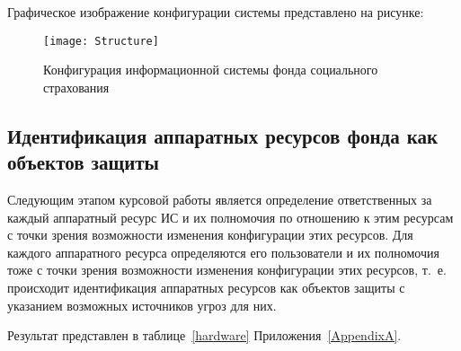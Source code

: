 Графическое изображение конфигурации системы представлено на рисунке:

\begin{figure}[h]
  \centering
  \texttt{[image: Structure]}
  \caption{Конфигурация информационной системы фонда социального страхования}
  \label{fig:structure}  
\end{figure}

\subsection{Идентификация аппаратных ресурсов
  фонда как объектов защиты}

Следующим этапом курсовой работы является определение ответственных за
каждый аппаратный ресурс ИС и их полномочия по отношению к этим
ресурсам с точки зрения возможности изменения конфигурации этих
ресурсов. Для каждого аппаратного ресурса определяются его
пользователи и их полномочия тоже с точки зрения возможности изменения
конфигурации этих ресурсов, т.~е. происходит идентификация аппаратных
ресурсов как объектов защиты с указанием возможных источников угроз
для них.

Результат представлен в таблице~\ref{hardware}
Приложения~\ref{AppendixA}.

